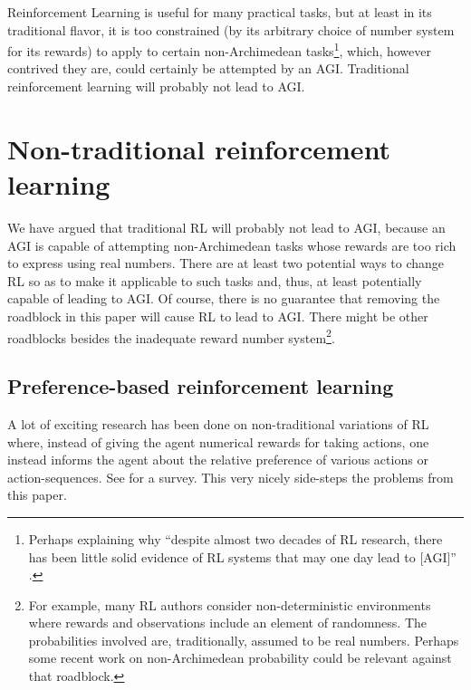 \documentclass[twoside,11pt]{article}
\begin{document}
Reinforcement Learning is useful for many practical tasks, but at least in
its traditional flavor, it is too constrained (by its arbitrary choice of number
system for its rewards) to apply to certain
non-Archimedean tasks\footnote{Perhaps explaining why
``despite almost two decades of RL research, there has been little solid
evidence of RL systems that may one day lead to [AGI]''
\citep{livingston}.}, which, however contrived they are, could certainly be
attempted by an AGI. Traditional reinforcement learning will probably
not lead to AGI.


\section{Non-traditional reinforcement learning}
\label{nontraditionalsection}

We have argued that traditional RL will probably not lead to AGI, because
an AGI is capable of attempting non-Archimedean tasks whose rewards are
too rich to express using real numbers. There are at least two
potential ways to change RL so as to make it applicable to such tasks and,
thus, at least potentially capable of leading to AGI. Of course, there is
no guarantee that removing the roadblock in this paper will cause RL to
lead to AGI. There might be other roadblocks besides the inadequate reward
number system\footnote{For example, many RL authors consider non-deterministic
environments where rewards and observations include an element of
randomness. The probabilities involved are, traditionally, assumed to be
real numbers. Perhaps some recent work \citep{benci2013non} on non-Archimedean
probability could be relevant against that roadblock.}.

\subsection{Preference-based reinforcement learning}

A lot of exciting research has been done on non-traditional variations
of RL where, instead of giving the agent numerical rewards for taking actions,
one instead informs the agent about the relative preference of various
actions or action-sequences. See \citep{wirth2017survey} for a survey.
This very nicely side-steps the problems from this paper.
\end{document}
